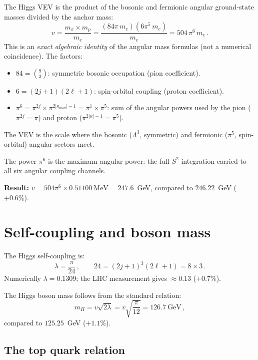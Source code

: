 \documentclass[11pt,letterpaper]{article}
\numberwithin{equation}{section}
\begin{document}
The Higgs VEV is the product of the bosonic and fermionic angular
ground-state masses divided by the anchor mass:
\begin{equation}\label{eq:vev}
  v = \frac{m_\pi \times m_p}{m_e}
  = \frac{(84\pi\,m_e)(6\pi^5\,m_e)}{m_e}
  = 504\,\pi^6\,m_e\,.
\end{equation}
This is an \emph{exact algebraic identity} of the angular mass formulas
(not a numerical coincidence). The factors:
\begin{itemize}
  \item $84 = \binom{9}{3}$: symmetric bosonic occupation (pion coefficient).
  \item $6 = (2j+1)(2\ell+1)$: spin-orbital coupling (proton coefficient).
  \item $\pi^6 = \pi^{2j} \times \pi^{2|\kappa_\mathrm{max}|-1}
    = \pi^1 \times \pi^5$: sum of the angular powers used by the
    pion ($\pi^{2j} = \pi$) and proton ($\pi^{2|\kappa|-1} = \pi^5$).
\end{itemize}
The VEV is the scale where the bosonic ($\Lambda^3$, symmetric) and
fermionic ($\pi^5$, spin-orbital) angular sectors meet.

The power $\pi^6$ is the maximum angular power: the full
$S^2$ integration carried to all six angular coupling channels.

\textbf{Result:} $v = 504\pi^6 \times 0.51100~\text{MeV} = 247.6$~GeV,
compared to $246.22$~GeV ($+0.6\%$).

\section{Self-coupling and boson mass}

The Higgs self-coupling is:
\begin{equation}\label{eq:lambda}
  \lambda = \frac{\pi}{24}\,,
  \qquad 24 = (2j+1)^3(2\ell+1) = 8 \times 3\,.
\end{equation}
Numerically $\lambda = 0.1309$; the LHC measurement gives
$\approx 0.13$ ($+0.7\%$).

The Higgs boson mass follows from the standard relation:
\begin{equation}\label{eq:mH}
  m_H = v\sqrt{2\lambda} = v\sqrt{\frac{\pi}{12}}
  = 126.7~\text{GeV}\,,
\end{equation}
compared to $125.25$~GeV ($+1.1\%$).

\subsection{The top quark relation}
\end{document}
